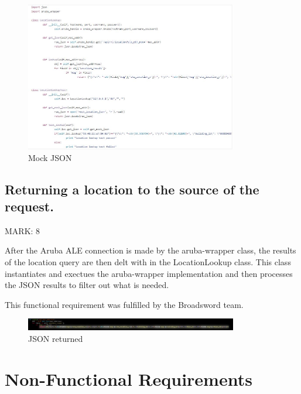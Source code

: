 \documentclass{article}
\begin{document}
\begin{figure}[ht]
  \includegraphics[width=350px]{Images/LocLookup.JPG}
  \caption{Mock JSON}

\label{Mock JSON}
\end{figure}


\subsection{Returning a location to the source of the request.}
\begin{flushleft}
MARK: 8
\end{flushleft}

\begin{flushleft}
After the Aruba ALE connection is made by the aruba-wrapper class, the results of the location query are then delt with in the LocationLookup class. This class instantiates and exectues the aruba-wrapper implementation and then processes the JSON results to filter out what is needed. 
\end{flushleft}

\begin{flushleft}
This functional requirement was fulfilled by the Broadsword team.
\end{flushleft}

\begin{figure}[ht]
  \includegraphics[width=350px]{Images/jsonreturn.jpg}
  \caption{JSON returned}
  \label{fig:JSON returned}
\end{figure}


\section{Non-Functional Requirements}
\end{document}
